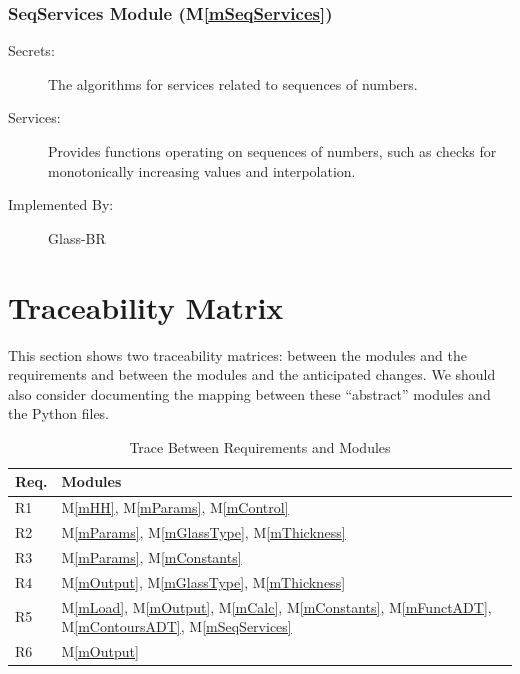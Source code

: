 \documentclass[12pt]{article}
\newcommand{\mref}[1]{M\ref{#1}}
\begin{document}
\subsubsection{SeqServices Module (\mref{mSeqServices})}

\begin{description}
\item[Secrets:] The algorithms for services related to sequences of numbers.
\item[Services:] Provides functions operating on sequences of numbers, such as
  checks for monotonically increasing values and interpolation.
\item[Implemented By:] Glass-BR
\end{description}

\section{Traceability Matrix} \label{SecTM}

This section shows two traceability matrices: between the modules and the
requirements and between the modules and the anticipated changes.  We should
also consider documenting the mapping between these ``abstract'' modules and the
Python files.

\begin{table}[H]
\centering
\begin{tabular}{p{} p{}}
  \toprule
  \textbf{Req.} & \textbf{Modules}\\
  \midrule
  R1 & \mref{mHH}, \mref{mParams}, \mref{mControl}\\
  R2 & \mref{mParams}, \mref{mGlassType}, \mref{mThickness}\\
  R3 & \mref{mParams}, \mref{mConstants}\\
  R4 & \mref{mOutput}, \mref{mGlassType}, \mref{mThickness}\\
  R5 & \mref{mLoad}, \mref{mOutput}, \mref{mCalc}, \mref{mConstants}, \mref{mFunctADT},
       \mref{mContoursADT}, \mref{mSeqServices}\\
  R6 & \mref{mOutput}\\
  \bottomrule
\end{tabular}
\caption{Trace Between Requirements and Modules}
\label{TblRT}
\end{table}
\end{document}

